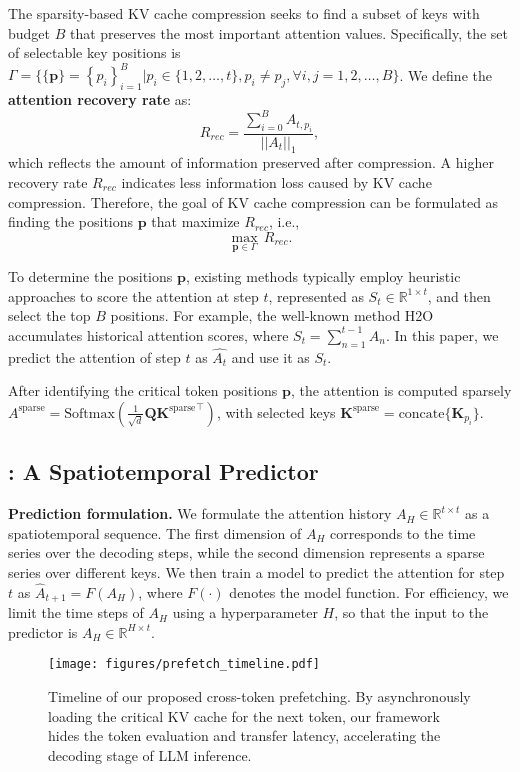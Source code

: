 The sparsity-based KV cache compression seeks to find a subset of keys with budget $B$ that preserves the most important attention values.
Specifically, the set of selectable key positions is $\Gamma=\{\{\mathbf{p}\}=\left\{p_i\right\}_{i=1}^B|p_i\in\{ 1,2,\ldots,t\} ,p_i\neq p_j,\forall i,j=1,2,\ldots,B\}$. 
We define the \textbf{attention recovery rate} as:
\begin{equation}
\label{eq:attention_recovery_score}
R_{rec} = \frac{\sum_{i=0}^{B}{A_{t, p_i}}}{||A_t||_1},
\end{equation}
which reflects the amount of information preserved after compression. A higher recovery rate $R_{rec}$ indicates less information loss caused by KV cache compression.
Therefore, the goal of KV cache compression can be formulated as finding the positions $\mathbf{p}$ that maximize $R_{rec}$, i.e.,
\begin{equation}
\label{eq:find_p}
\underset{\mathbf{p} \in \Gamma }{\max} \,R_{rec}. 
\end{equation}

To determine the positions $\mathbf{p}$, existing methods typically employ heuristic approaches to score the attention at step $t$, represented as $S_t \in \mathbb{R}^{1 \times t}$, and then select the top $B$ positions. 
For example, the well-known method H2O~\citep{zhang2023h2o} accumulates historical attention scores, where $S_t = \sum_{n=1}^{t-1}{A_n}$. 
In this paper, we predict the attention of step $t$ as $\hat{A_t}$ and use it as $S_t$.

After identifying the critical token positions $\mathbf{p}$, the attention is computed sparsely $A^\text{sparse} = \text{Softmax}\left(\frac{1}{\sqrt{d}} \mathbf{Q} {\mathbf{K}^{\text{sparse}}}^\top \right)$, with selected keys $\mathbf{K}^{\text{sparse}} = \text{concate}\{\mathbf{K}_{p_i}\}$.


\subsection{\ours: A Spatiotemporal Predictor}
\label{sec:attention_predictor}

\textbf{Prediction formulation.} We formulate the attention history $A_H \in \mathbb{R}^{t\times t}$ as a spatiotemporal sequence.
The first dimension of $A_H$ corresponds to the time series over the decoding steps,
while the second dimension represents a sparse series over different keys.
We then train a model to predict the attention for step $t$ as $\hat{A}_{t+1} = F(A_H)$, where $F(\cdot)$ denotes the model function.
For efficiency, we limit the time steps of $A_H$ using a hyperparameter $H$, so that the input to the predictor is $A_H \in \mathbb{R}^{H \times t}$.
\begin{figure*}[t]
    \centering
    \texttt{[image: figures/prefetch\_timeline.pdf]}
    \caption{Timeline of our proposed cross-token prefetching. By asynchronously loading the critical KV cache for the next token, our framework hides the token evaluation and transfer latency, accelerating the decoding stage of LLM inference.}
    \label{fig:prefetch_timeline}
\end{figure*}


